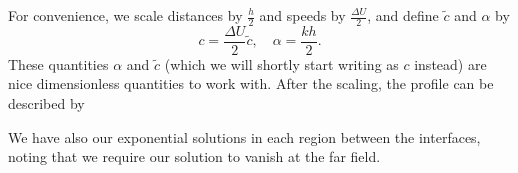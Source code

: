 \documentclass[a4paper]{article}
\begin{document}
For convenience, we scale distances by $\frac{h}{2}$ and speeds by $\frac{\Delta U}{2}$, and define $\tilde{c}$ and $\alpha$ by
\[
  c = \frac{\Delta U}{2} \tilde{c},\quad \alpha = \frac{kh}{2}.
\]
These quantities $\alpha$ and $\tilde{c}$ (which we will shortly start writing as $c$ instead) are nice dimensionless quantities to work with. After the scaling, the profile can be described by
\begin{center}
\end{center}
We have also our exponential solutions in each region between the interfaces, noting that we require our solution to vanish at the far field.
\end{document}

